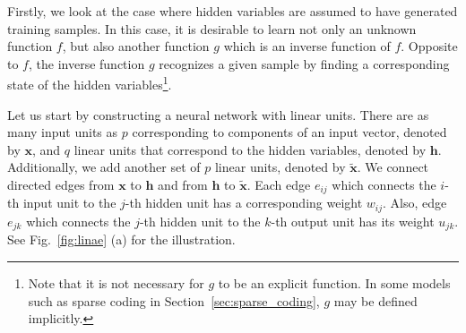 \documentclass[dissertation,nocontribution,draft*]{aaltoseries}
\newcommand{\vect}[1]{\mathbf{#1}}
\newcommand{\vh}[0]{\vect{h}}
\newcommand{\vx}[0]{\vect{x}}
\begin{document}
Firstly, we look at the case where hidden variables are
assumed to have generated training samples. In this case, it
is desirable to learn not only an unknown function $f$, but
also another function $g$ which is an inverse function of
$f$. Opposite to $f$, the inverse function $g$ recognizes a
given sample by finding a corresponding state of the hidden
variables\footnote{Note that it is not necessary for $g$ to
be an explicit function. In some models such as sparse
coding in Section~\ref{sec:sparse_coding}, $g$ may be defined
implicitly.}.

Let us start by constructing a neural network with linear
units. There are as many input units as $p$ corresponding to
components of an input vector, denoted by $\vx$, and $q$
linear units that correspond to the hidden variables,
denoted by $\vh$. Additionally, we add another set of $p$
linear units, denoted by $\tilde{\vx}$. We connect directed
edges from $\vx$ to $\vh$ and from $\vh$ to $\tilde{\vx}$.
Each edge $e_{ij}$ which connects the $i$-th input unit
to the $j$-th hidden unit has a corresponding weight
$w_{ij}$. Also, edge $e_{jk}$ which connects the $j$-th
hidden unit to the $k$-th output unit has its weight
$u_{jk}$. See Fig.~\ref{fig:linae} (a) for the illustration.
\end{document}
